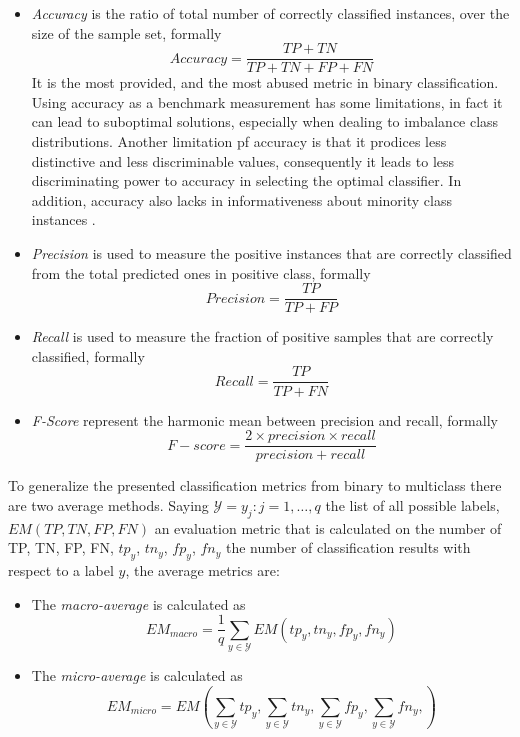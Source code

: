 \begin{itemize}
	\item \textit{Accuracy} is the ratio of total number of correctly classified instances, over the size of the sample set, formally
	\[ Accuracy = \frac{TP + TN}{TP + TN + FP + FN} \]
	It is the most provided, and the most abused metric in binary classification. Using accuracy as a benchmark measurement has some limitations, in fact it can lead to suboptimal solutions, especially when dealing to imbalance class distributions. Another limitation pf accuracy is that it prodices less distinctive and less discriminable values, consequently it leads to less discriminating power to accuracy in selecting the optimal classifier. In addition, accuracy also lacks in informativeness about minority class instances \cite{article-ev-metrics}.
	
	\item \textit{Precision} is used to measure the positive instances that are correctly classified from the total predicted ones in positive class, formally
	\[ Precision = \frac{TP}{TP + FP} \]
	
	\item \textit{Recall} is used to measure the fraction of positive samples that are correctly classified, formally
	\[ Recall = \frac{TP}{TP + FN} \]
	
	\item \textit{F-Score} represent the harmonic mean between precision and recall, formally
	\[ F-score = \frac{2 \times precision \times recall}{precision + recall} \]
\end{itemize}

To generalize the presented classification metrics from binary to multiclass there are two average methods. Saying $\mathcal{Y}={y_j : j = 1, \dots, q}$ the list of all possible labels, $EM(TP, TN, FP, FN)$ an evaluation metric that is calculated on the number of TP, TN, FP, FN, $tp_y$, $tn_y$, $fp_y$, $fn_y$ the number of classification results with respect to a label $y$, the average metrics are:

\begin{itemize}
	\item The \textit{macro-average} is calculated as
	\[ EM_{macro} = \frac{1}{q} \sum_{y \in \mathcal{Y}} EM(tp_y, tn_y, fp_y, fn_y) \]
	
	\item The \textit{micro-average} is calculated as
	\[ EM_{micro} = EM \left( \sum_{y \in \mathcal{Y}} tp_y, \sum_{y \in \mathcal{Y}} tn_y, \sum_{y \in \mathcal{Y}} fp_y, \sum_{y \in \mathcal{Y}} fn_y,  \right) \]
\end{itemize}

